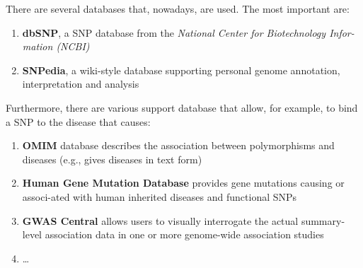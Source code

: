 \newpage

There are several databases that, nowadays, are used. The most important are:

\begin{enumerate}
	\item \textbf{dbSNP}, a SNP database from the \emph{National Center for Biotechnology Infor-mation (NCBI)}
	\item \textbf{SNPedia}, a wiki-style database supporting personal genome annotation, interpretation and analysis
	\end{enumerate}

Furthermore, there are various support database that allow, for example, to bind a SNP to the disease that causes:

\begin{enumerate}
	\item \textbf{OMIM} database describes the association between polymorphisms and diseases (e.g., gives diseases in text form)
	\item \textbf{Human Gene Mutation Database} provides gene mutations causing or associ-ated with human inherited diseases and functional SNPs
	\item \textbf{GWAS Central} allows users to visually interrogate the actual summary-level association data in one or more genome-wide association studies
	\item \ldots
	\end{enumerate}